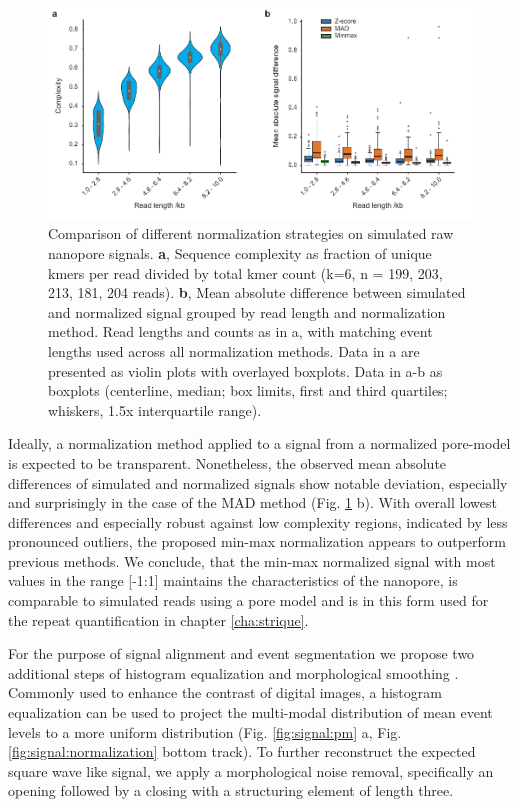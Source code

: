 \begin{figure}[h]
	\centering
	\includegraphics[width=1.0\textwidth]{figures/signal/norm_methods.pdf}
	\captionsetup{format=plain}
	\caption[Signal normalization on simulated reads]{Comparison of different normalization strategies on simulated raw nanopore signals. \textbf{a}, Sequence complexity as fraction of unique kmers per read divided by total kmer count (k=6, n = 199, 203, 213, 181, 204 reads). \textbf{b}, Mean absolute difference between simulated and normalized signal grouped by read length and normalization method. Read lengths and counts as in a, with matching event lengths used across all normalization methods. Data in a are presented as violin plots with overlayed boxplots. Data in a-b as boxplots (centerline, median; box limits, first and third quartiles; whiskers, 1.5x interquartile range).}
	\label{fig:signal:norm_methods}
\end{figure}

Ideally, a normalization method applied to a signal from a normalized pore-model is expected to be transparent. Nonetheless, the observed mean absolute differences of simulated and normalized signals show notable deviation, especially and surprisingly in the case of the MAD method (Fig. \ref{fig:signal:norm_methods} b). With overall lowest differences and especially robust against low complexity regions, indicated by less pronounced outliers, the proposed min-max normalization appears to outperform previous methods. We conclude, that the min-max normalized signal with most values in the range [-1:1] maintains the characteristics of the nanopore, is comparable to simulated reads using a pore model and is in this form used for the repeat quantification in chapter \ref{cha:strique}.

For the purpose of signal alignment and event segmentation we propose two additional steps of  histogram equalization and morphological smoothing \cite{Gonzalez2006}. Commonly used to enhance the contrast of digital images, a histogram equalization can be used to project the multi-modal distribution of mean event levels to a more uniform distribution (Fig. \ref{fig:signal:pm} a, Fig. \ref{fig:signal:normalization} bottom track). 
To further reconstruct the expected square wave like signal, we apply a morphological noise removal, specifically an opening followed by a closing with a structuring element of length three.

